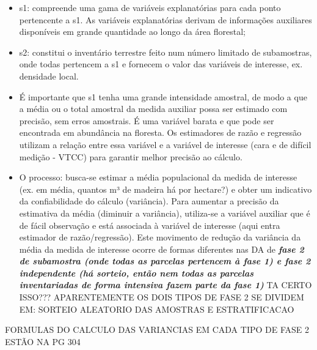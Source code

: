 \documentclass[
]{article}
\begin{document}
\begin{itemize}
\item
  s1: compreende uma gama de variáveis explanatórias para cada ponto
  pertencente a s1. As variáveis explanatórias derivam de informações
  auxiliares disponíveis em grande quantidade ao longo da área
  florestal;\\
\item
  s2: constitui o inventário terrestre feito num número limitado de
  subamostras, onde todas pertencem a s1 e fornecem o valor das
  variáveis de interesse, ex. densidade local.
\item
  É importante que s1 tenha uma grande intensidade amostral, de modo a
  que a média ou o total amostral da medida auxiliar possa ser estimado
  com precisão, sem erros amostrais. É uma variável barata e que pode
  ser encontrada em abundância na floresta. Os estimadores de razão e
  regressão utilizam a relação entre essa variável e a variável de
  interesse (cara e de difícil medição - VTCC) para garantir melhor
  precisão ao cálculo.
\item
  O processo: busca-se estimar a média populacional da medida de
  interesse (ex. em média, quantos m³ de madeira há por hectare?) e
  obter um indicativo da confiabilidade do cálculo (variância). Para
  aumentar a precisão da estimativa da média (diminuir a variância),
  utiliza-se a variável auxiliar que é de fácil observação e está
  associada à variável de interesse (aqui entra estimador de
  razão/regressão). Este movimento de redução da variância da média da
  medida de interesse ocorre de formas diferentes nas DA de
  \textbf{\emph{fase 2 de subamostra (onde todas as parcelas pertencem à
  fase 1) e fase 2 independente (há sorteio, então nem todas as parcelas
  inventariadas de forma intensiva fazem parte da fase 1)}} TA CERTO
  ISSO??? APARENTEMENTE OS DOIS TIPOS DE FASE 2 SE DIVIDEM EM: SORTEIO
  ALEATORIO DAS AMOSTRAS E ESTRATIFICACAO
\end{itemize}

FORMULAS DO CALCULO DAS VARIANCIAS EM CADA TIPO DE FASE 2 ESTÃO NA PG
304
\end{document}
